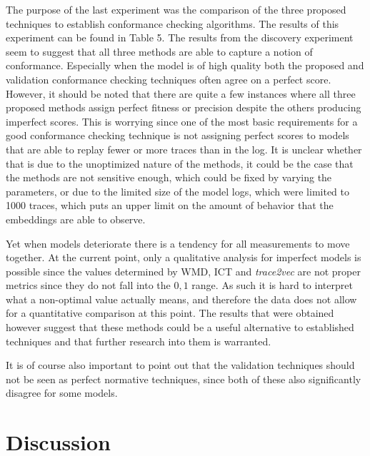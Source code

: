 \documentclass[runningheads]{template/llncs}
\begin{document}
The purpose of the last experiment was the comparison of the three proposed techniques to establish conformance checking algorithms.
The results of this experiment can be found in \cite{PBWe20} Table 5.
The results from the discovery experiment seem to suggest that all three methods are able to capture a notion of conformance.
Especially when the model is of high quality both the proposed and validation conformance checking techniques often agree on a perfect score.
However, it should be noted that there are quite a few instances where all three proposed methods assign perfect fitness or precision despite the others producing imperfect scores.
This is worrying since one of the most basic requirements for a good conformance checking technique is not assigning perfect scores to models that are able to replay fewer or more traces than in the log.
It is unclear whether that is due to the unoptimized nature of the methods, it could be the case that the methods are not sensitive enough, which could be fixed by varying the parameters, or due to the limited size of the model logs, which were limited to 1000 traces, which puts an upper limit on the amount of behavior that the embeddings are able to observe.

Yet when models deteriorate there is a tendency for all measurements to move together.
At the current point, only a qualitative analysis for imperfect models is possible since the values determined by WMD, ICT and \emph{trace2vec} are not proper metrics since they do not fall into the $0,1$ range.
As such it is hard to interpret what a non-optimal value actually means, and therefore the data does not allow for a quantitative comparison  at this point.
The results that were obtained however suggest that these methods could be a useful alternative to established techniques and that further research into them is warranted.

It is of course also important to point out that the validation techniques should not be seen as perfect normative techniques, since both of these also significantly disagree for some models. 

\color{black}
\section{Discussion}
\label{sec:discussion}
\end{document}
